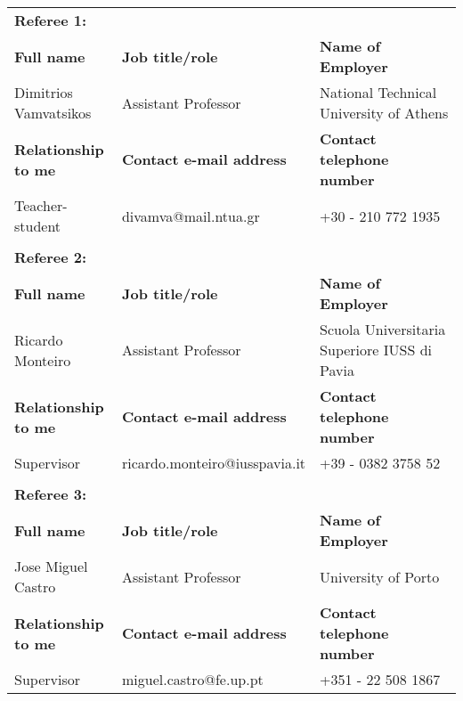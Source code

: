 \begin{tabular}{p{0.25\linewidth}  p{0.3\linewidth}  p{0.5\linewidth} }
	\textbf{Referee 1:}         &                                 &  \\
	\textbf{Full name}          & \textbf{Job title/role}         & \textbf{Name of Employer}                    \\
	Dimitrios Vamvatsikos       & Assistant Professor             & National Technical University of Athens      \\
	\textbf{Relationship to me} & \textbf{Contact e-mail address} & \textbf{Contact telephone number}            \\
	Teacher-student             & divamva@mail.ntua.gr            & +30 - 210 772 1935                           \\
	                            &  \\
	\textbf{Referee 2:}         &                                 &  \\
	\textbf{Full name}          & \textbf{Job title/role}         & \textbf{Name of Employer}                    \\
	Ricardo Monteiro            & Assistant Professor             & Scuola Universitaria Superiore IUSS di Pavia \\
	\textbf{Relationship to me} & \textbf{Contact e-mail address} & \textbf{Contact telephone number}            \\
	Supervisor                  & ricardo.monteiro@iusspavia.it   & +39 - 0382 3758 52                           \\
	                            &  \\
	\textbf{Referee 3:}         &                                 &  \\
	\textbf{Full name}          & \textbf{Job title/role}         & \textbf{Name of Employer}                    \\
	Jose Miguel Castro          & Assistant Professor             & University of Porto                          \\
	\textbf{Relationship to me} & \textbf{Contact e-mail address} & \textbf{Contact telephone number}            \\
	Supervisor                  & miguel.castro@fe.up.pt          & +351 - 22 508 1867
\end{tabular}